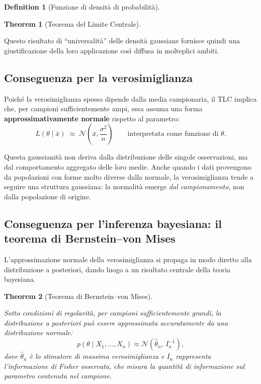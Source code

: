 \documentclass[
  letterpaper,
  DIV=11,
  numbers=noendperiod,
  oneside]{scrreprt}
\theoremstyle{definition}
\theoremstyle{plain}
\newtheorem{theorem}{Theorem}[chapter]
\theoremstyle{definition}
\newtheorem{definition}{Definition}[chapter]
\theoremstyle{remark}
\begin{document}
\begin{definition}[Funzione di densità di
probabilità]
\begin{theorem}[Teorema del Limite
Centrale]
\end{theorem}

Questo risultato di ``universalità'' delle densità gaussiane fornisce
quindi una giustificazione della loro applicazione così diffusa in
molteplici ambiti.

\subsection{Conseguenza per la
verosimiglianza}\label{conseguenza-per-la-verosimiglianza}

Poiché la verosimiglianza spesso dipende dalla media campionaria, il TLC
implica che, per campioni sufficientemente ampi, essa assuma una forma
\textbf{approssimativamente normale} rispetto al parametro: \[
L(\theta \mid \bar{x}) \;\approx\; \mathcal{N}\!\left(\bar{x}, \frac{\sigma^2}{n}\right)
\qquad \text{interpretata come funzione di } \theta.
\]

Questa gaussianità non deriva dalla distribuzione delle singole
osservazioni, ma dal comportamento aggregato delle loro medie. Anche
quando i dati provengono da popolazioni con forme molto diverse dalla
normale, la verosimiglianza tende a seguire una struttura gaussiana: la
normalità emerge \emph{dal campionamento}, non dalla popolazione di
origine.

\subsection{Conseguenza per l'inferenza bayesiana: il teorema di
Bernstein--von
Mises}\label{conseguenza-per-linferenza-bayesiana-il-teorema-di-bernsteinvon-mises}

L'approssimazione normale della verosimiglianza si propaga in modo
diretto alla distribuzione a posteriori, dando luogo a un risultato
centrale della teoria bayesiana.

\begin{theorem}[Teorema di Bernstein--von
Mises]\protect\hypertarget{thm-bvm}{}\label{thm-bvm}

Sotto condizioni di regolarità, per campioni sufficientemente grandi, la
distribuzione a posteriori può essere approssimata accuratamente da una
distribuzione normale: \[
p(\theta \mid X_1, \ldots, X_n) \approx \mathcal{N}(\hat{\theta}_n,\, I_n^{-1}),
\] dove \(\hat{\theta}_n\) è lo stimatore di massima verosimiglianza e
\(I_n\) rappresenta l'\emph{informazione di Fisher} osservata, che
misura la quantità di informazione sul parametro contenuta nel campione.


\end{theorem}
\end{definition}
\end{document}
